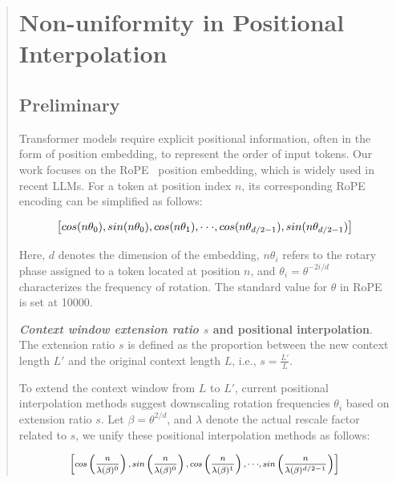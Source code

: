 \begin{abstract}
\section{Non-uniformity in Positional Interpolation}
\label{sec:analysis}

\subsection{Preliminary}

Transformer models require explicit positional information, often in the form of position embedding, to represent the order of input tokens. Our work focuses on the RoPE~\cite{rope} position embedding, which is widely used in recent  LLMs. For a token at position index $n$, its corresponding RoPE encoding can be simplified as follows:

\begin{equation}
		\fontsize{7.8}{7.8} \selectfont
	\label{eq:rope}
	\left[ cos(n\theta_0), sin(n\theta_0), cos(n\theta_1), \cdot\cdot\cdot, cos(n\theta_{d/2-1}), sin(n\theta_{d/2-1}) \right]   
\end{equation}

Here, $d$ denotes the dimension of the embedding, $n\theta_i$ refers to the rotary phase assigned to a token located at position $n$, and $\theta_i=\theta^{-2i/d}$ characterizes the frequency of rotation. The standard value for $\theta$ in RoPE is set at 10000.

\textbf{\emph{Context window extension ratio $s$} and positional interpolation}. The extension ratio $s$ is defined as the proportion between the new context length $L'$ and the original context length $L$, i.e., $s=\frac{L'}{L}$.

To extend the context window from $L$ to $L'$, current positional interpolation methods suggest downscaling rotation frequencies $\theta_i$ based on extension ratio $s$. Let $\beta=\theta^{2/d}$, and $\lambda$ denote the actual rescale factor related to $s$, we   unify these positional interpolation methods as follows:

\begin{equation}	
	\fontsize{7.5}{7.5} \selectfont
	\label{eq:unified_rope}
	\begin{aligned}
		\left[cos\left(\frac{n}{\lambda(\beta)^0}\right), sin \left(\frac{n}{\lambda(\beta)^0}\right), cos\left(\frac{n}{\lambda(\beta)^1}\right), \cdot\cdot\cdot,  sin \left(\frac{n}{\lambda(\beta)^{d/2-1}}\right) \right]   
	\end{aligned}
\end{equation}


\end{abstract}
